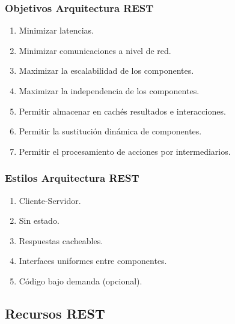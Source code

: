 \documentclass[handout,a4paper,slidestop,xcolor=pst,blue]{beamer}
\begin{document}
\begin{frame}[c]
	\frametitle{Objetivos Arquitectura REST}
    \begin{enumerate}[<+->]
        \item Minimizar latencias.
        \item Minimizar comunicaciones a nivel de red.
        \item Maximizar la escalabilidad de los componentes.
        \item Maximizar la independencia de los componentes.
        \item Permitir almacenar en cachés resultados e interacciones.
        \item Permitir la sustitución dinámica de componentes.
        \item Permitir el procesamiento de acciones por intermediarios.
    \end{enumerate}
\end{frame}

\begin{frame}[c]
	\frametitle{Estilos Arquitectura REST}
    \begin{enumerate}[<+->]
        \item Cliente-Servidor.
        \item Sin estado.
        \item Respuestas cacheables.
        \item Interfaces uniformes entre componentes.
        \item Código bajo demanda (opcional).
    \end{enumerate}
\end{frame}

\subsection{Recursos REST}
\end{document}
